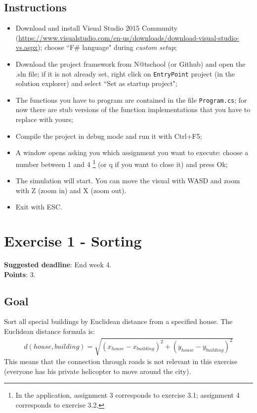 \documentclass[10pt,a4paper]{article}
\begin{document}
\subsection*{Instructions}
\begin{itemize}[noitemsep]
\item Download and install Visual Studio 2015 Community (\url{https://www.visualstudio.com/en-us/downloads/download-visual-studio-vs.aspx}); choose ``F\# language" during \textit{custom setup}; 
\item Download the project framework from N@tschool (or Github) and open the .sln file; if it is not already set, right click on \texttt{EntryPoint} project (in the solution explorer) and select ``Set as startup project";
\item The functions you have to program are contained in the file \texttt{Program.cs}; for now there are stub versions of the function implementations that you have to replace with yours;
\item Compile the project in debug mode and run it with Ctrl+F5;
\item A window opens asking you which assignment you want to execute: choose a number between 1 and 4 \footnote{In the application, assignment 3 corresponds to exercise 3.1; assignment 4 corresponds to exercise 3.2.} (or q if you want to close it) and press Ok;
\item The simulation will start. You can move the visual with WASD and zoom with Z (zoom in) and X (zoom out).
\item Exit with ESC. 
\end{itemize}

\section*{Exercise 1 - Sorting}

\textbf{Suggested deadline}: End week 4. \\
\textbf{Points}: 3.

\subsection*{Goal}
Sort all special buildings by Euclidean distance from a specified house. The Euclidean distance formula is:
\begin{align*}
d(house,building) = \sqrt{(x_{house} - x_{building})^{2} + (y_{house} - y_{building})^{2} } 
\end{align*}
This means that the connection through roads is not relevant in this exercise (everyone has his private helicopter to move around the city).
\end{document}
